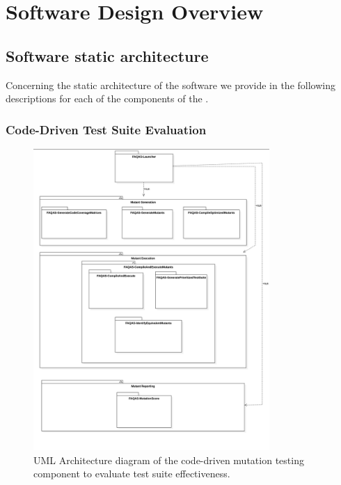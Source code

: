 
\chapter{Software Design Overview}

\section{Software static architecture}

Concerning the static architecture of the software we provide in the following descriptions for each of the components of the \FAQAS.

\subsection{Code-Driven Test Suite Evaluation}

\begin{figure}[h]
  \centering
	\includegraphics[width=0.8\textwidth]{images/static_architecture.png}
      \caption{UML Architecture diagram of the code-driven mutation testing component to evaluate test suite effectiveness.}
      \label{fig:architecture_diagram}
\end{figure}

